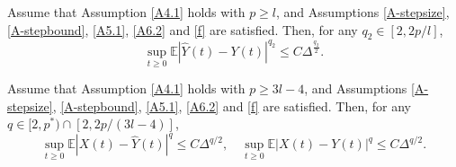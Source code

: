 \documentclass[10pt,a4paper]{amsart}
\begin{document}
\begin{lemma}  \label{lem-6.3}
Assume that Assumption \ref{A4.1} holds with $p \ge l$, and Assumptions \ref{A-stepsize}, \ref{A-stepbound}, \ref{A5.1}, \ref{A6.2} and \eqref{f} are satisfied. Then, for any $q_2 \in [2, 2p/l]$, 
\begin{equation*}
	\mathop {\sup }\limits_{t \ge 0} \mathbb{E}{\left| {\hat Y(t) - Y(t)} \right|^{{q_2}}} \le C{\Delta ^{\frac{{{q_2}}}{2}}}.
\end{equation*}

\end{lemma}

\begin{theorem}  \label{th-a3}
Assume that Assumption \ref{A4.1} holds with $p \ge 3l-4$, and Assumptions \ref{A-stepsize}, \ref{A-stepbound}, \ref{A5.1}, \ref{A6.2} and \eqref{f} are satisfied.
Then, for any $q \in [2,p^ * ) \cap  \left[ {2,{{2p}}/{(3l - 4)}} \right]$,
\begin{equation*}
	\mathop {\sup }\limits_{t \ge 0} \mathbb{E}{\left| {X(t) - \hat Y(t)} \right|^q} \le {C}\Delta^{{q}/{2}}, \quad  \mathop {\sup }\limits_{t \ge 0} \mathbb{E}{\left| {X(t) - Y(t)} \right|^q} \le {C}\Delta^{{q}/{2}}.
\end{equation*}
\end{theorem}
\end{document}
